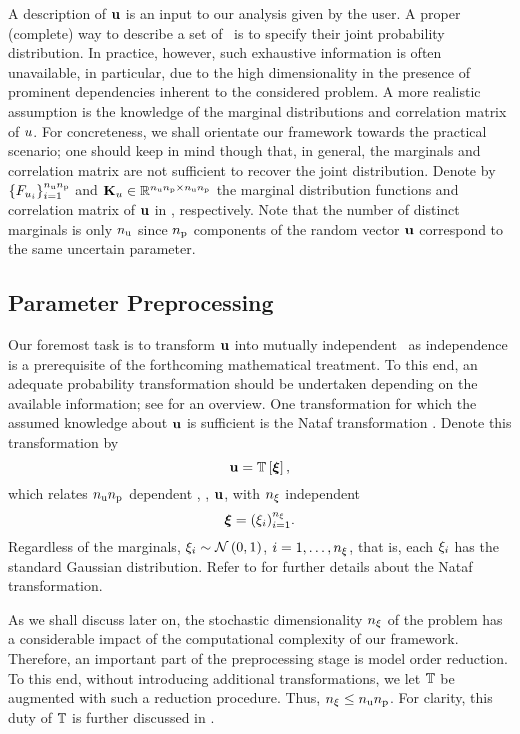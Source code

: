 A description of $\mathbf{u}$ is an input to our analysis given by the user.
A proper (complete) way to describe a set of \rvs\ is to specify their joint probability distribution.
In practice, however, such exhaustive information is often unavailable, in particular, due to the high dimensionality in the presence of prominent dependencies inherent to the considered problem.
A more realistic assumption is the knowledge of the marginal distributions and correlation matrix of $u$.
For concreteness, we shall orientate our framework towards the practical scenario; one should keep in mind though that, in general, the marginals and correlation matrix are not sufficient to recover the joint distribution.
Denote by $\{ F_{u_i} \}_{i = 1}^{{n_\text{u}} {n_\text{p}}}$ and $\mathbf{K}_u \in \mathbb{R}^{{n_\text{u}} {n_\text{p}} \times {n_\text{u}} {n_\text{p}}}$ the marginal distribution functions and correlation matrix of $\mathbf{u}$ in , respectively.
Note that the number of distinct marginals is only ${n_\text{u}}$ since ${n_\text{p}}$ components of the random vector $\mathbf{u}$ correspond to the same uncertain parameter.

\subsection{Parameter Preprocessing} 
Our foremost task is to transform $\mathbf{u}$ into mutually independent \rvs\ as independence is a prerequisite of the forthcoming mathematical treatment.
To this end, an adequate probability transformation should be undertaken depending on the available information; see \cite{eldred2008} for an overview.
One transformation for which the assumed knowledge about $\mathbf{u}$ is sufficient is the Nataf transformation \cite{li2008}.
Denote this transformation by
\begin{equation} \elab{probability-transformation}
  \vu = \transformation{\vz},
\end{equation}
which relates ${n_\text{u}} {n_\text{p}}$ dependent \rvs, \ie, $\mathbf{u}$, with ${n_\xi}$ independent \rvs
\begin{equation} \elab{independent-random-variables}
  \vz = (\z_i)_{i = 1}^\nvars.
\end{equation}
Regardless of the marginals, $\xi_i \sim \mathcal{N}\left( 0, 1 \right)$, $i = 1, \dots, {n_\xi}$, that is, each $\xi_i$ has the standard Gaussian distribution.
Refer to  for further details about the Nataf transformation.

As we shall discuss later on, the stochastic dimensionality ${n_\xi}$ of the problem has a considerable impact of the computational complexity of our framework.
Therefore, an important part of the preprocessing stage is model order reduction.
To this end, without introducing additional transformations, we let $\transformation$ be augmented with such a reduction procedure.
Thus, ${n_\xi} \leq {n_\text{u}} {n_\text{p}}$.
For clarity, this duty of $\transformation$ is further discussed in .

